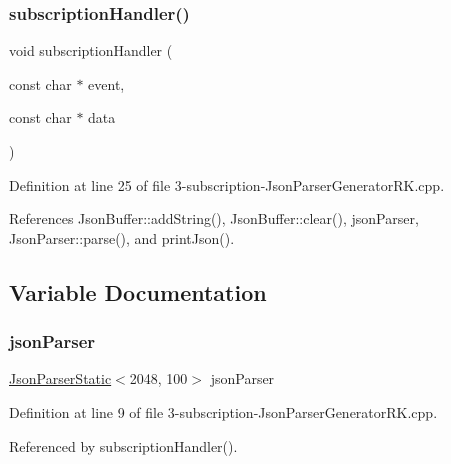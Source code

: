 \subsubsection{\texorpdfstring{subscription\+Handler()}{subscriptionHandler()}}
{\footnotesize\ttfamily void subscription\+Handler (\begin{DoxyParamCaption}\item[{const char $\ast$}]{event,  }\item[{const char $\ast$}]{data }\end{DoxyParamCaption})}



Definition at line 25 of file 3-\/subscription-\/\+Json\+Parser\+Generator\+R\+K.\+cpp.



References Json\+Buffer\+::add\+String(), Json\+Buffer\+::clear(), json\+Parser, Json\+Parser\+::parse(), and print\+Json().



\subsection{Variable Documentation}
\mbox{\label{3-subscription-_json_parser_generator_r_k_8cpp_af1c065455ff8e2f533af5dd925c8469d}} 
\subsubsection{\texorpdfstring{json\+Parser}{jsonParser}}
{\footnotesize\ttfamily \hyperlink{class_json_parser_static}{Json\+Parser\+Static}$<$2048, 100$>$ json\+Parser}



Definition at line 9 of file 3-\/subscription-\/\+Json\+Parser\+Generator\+R\+K.\+cpp.



Referenced by subscription\+Handler().

